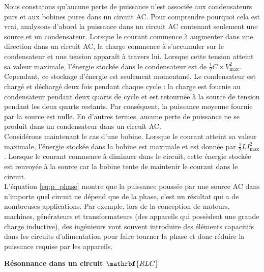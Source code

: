 \documentclass[titlepage,oneside,a4paper,11pt]{book} %
\begin{document}
Nous constatons qu'aucune perte de puissance n'est associée aux condensateurs purs et aux bobines pures dans un circuit AC. Pour comprendre pourquoi cela est vrai, analysons d'abord la puissance dans un circuit AC contenant seulement une source et un condensateur. Lorsque le courant commence à augmenter dans une direction dans un circuit AC, la charge commence à s'accumuler sur le condensateur et une tension apparaît à travers lui. Lorsque cette tension atteint sa valeur maximale, l'énergie stockée dans le condensateur est de $\frac{1}{2}C\times V_{\mathrm{max}}^2$. Cependant, ce stockage d'énergie est seulement momentané. Le condensateur est chargé et déchargé deux fois pendant chaque cycle : la charge est fournie au condensateur pendant deux quarts de cycle et est retournée à la source de tension pendant les deux quarts restants. Par conséquent, la puissance moyenne fournie par la source est nulle. En d'autres termes, aucune perte de puissance ne se produit dans un condensateur dans un circuit AC.\\

Considérons maintenant le cas d'une bobine. Lorsque le courant atteint sa valeur maximale, l'énergie stockée dans la bobine est maximale et est donnée par $\frac{1}{2}LI^2_{\mathrm{max}}$. Lorsque le courant commence à diminuer dans le circuit, cette énergie stockée est renvoyée à la source car la bobine tente de maintenir le courant dans le circuit.\\

L'équation \ref{eq:p_phase} montre que la puissance poussée par une source AC dans n'importe quel circuit ne dépend que de la phase, c'est un résultat qui a de nombreuses applications. Par exemple, lors de la conception de moteurs, machines, générateurs et transformateurs (des appareils qui possèdent une grande charge inductive), des ingénieurs vont souvent introduire des éléments capacitifs dans les circuits d'alimentation pour faire tourner la phase et donc réduire la puissance requise par les appareils.\\
\newpage

{\Large \textbf{Résonnance dans un  circuit $\mathrbf{RLC}$}}\\
\end{document}
